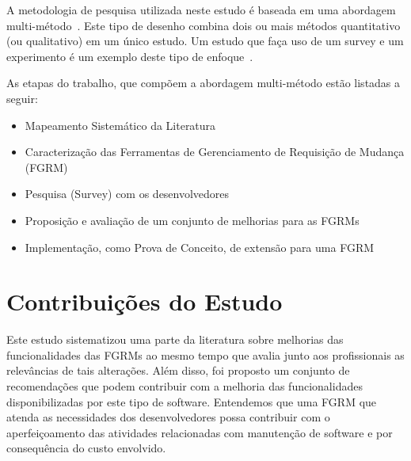 A metodologia de pesquisa utilizada neste estudo é baseada em uma abordagem
multi-método~\cite{hesse2010mixed}. Este tipo de desenho combina dois ou mais
métodos quantitativo (ou qualitativo) em um único estudo. Um estudo que faça uso
de um survey e um experimento é um exemplo deste tipo de
enfoque~\cite{hesse2010mixed}.


As etapas do trabalho, que compõem a abordagem multi-método estão listadas a
seguir:

\begin{itemize}[(i)]
	\item Mapeamento Sistemático da Literatura~\cite{Petersen2008}
	\item Caracterização das Ferramentas de Gerenciamento de Requisição de
		Mudança (FGRM)
	\item Pesquisa (Survey) com os
		desenvolvedores~\cite{wohlin2012experimentation}
	\item Proposição e avaliação de um conjunto de melhorias para as FGRMs
    \item Implementação, como Prova de Conceito, de extensão para uma FGRM
\end{itemize}

\section{Contribuições do Estudo}
\label{sec:intro-contribuicao}

Este estudo sistematizou uma parte da literatura sobre melhorias das
funcionalidades das FGRMs ao mesmo tempo que avalia junto aos profissionais as
relevâncias de tais alterações. Além disso, foi proposto um conjunto de
recomendações que podem contribuir com a melhoria das funcionalidades
disponibilizadas por este tipo de software. Entendemos que uma FGRM que atenda
as necessidades dos desenvolvedores possa contribuir com o aperfeiçoamento das
atividades relacionadas com manutenção de software e por consequência do custo
envolvido.

